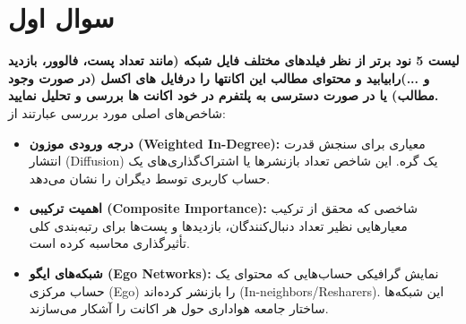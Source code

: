 \documentclass{article}
\begin{document}
\pagestyle{headings}
\maketitle
{}
\newpage
\begin{abstract}
	اعتراضات دی‌ماه ۱۴۰۴ در ایران، واکنشی به نوسانات ارزی و مشکلات معیشتی بود که به‌سرعت به مطالبات سیاسی گسترده‌تر تبدیل شد. این گزارش با استفاده از مفاهیم بنیادین علم شبکه، به تحلیل نقش سه پلتفرم تلگرام، اینستاگرام و توییتر می‌پردازد. داده‌های مستخرج از کدهای تحلیل شبکه، نشان‌دهنده ساختارهای قدرت متمرکز، استراتژی‌های جنگ شناختی و ظهور جریان‌های سلطنتی‌طلب به عنوان کنشگران اصلی انتشار محتوا در این بازه زمانی است.
	\\
	در دهه اخیر، شبکه‌های اجتماعی به میدان اصلی رقابت‌های سیاسی و اجتماعی در ایران تبدیل شده‌اند . اعتراضات دی‌ماه ۱۴۰۴، که با شعارهایی علیه نظام سیاسی همراه بود، نمونه بارزی از این تحول است. گزارش‌های میدانی از گسترش نارضایتی‌ها در شهرهای بزرگی مانند تهران، اصفهان و ایلام حکایت دارد . در چنین شرایطی، پلتفرم‌های دیجیتال به عنوان «ساختارهای سازمان‌دهی‌کننده» و «تقویت‌کننده روایت‌ها» عمل می‌کنند . هدف این گزارش، شناسایی بازیگران کلیدی (Key Players) در هر پلتفرم و تحلیل نقش آن‌ها در انتشار پیام‌های اعتراضی یا سرکوب روایت‌ها بر اساس شاخص‌های علم شبکه است.
	\\
	درادامه در قالب پاسخ به سوالات به تحلیل ابعاد مختلف اعتراضات دی 1404 می پردازیم:
\end{abstract}


\section{سوال اول}
\textbf{لیست 5 نود برتر از نظر فیلدهای مختلف فایل شبکه (مانند تعداد پست، فالوور، بازدید و ...)رابیابید و محتوای مطالب این
	اکانتها را درفایل های اکسل (در صورت وجود مطالب) یا در صورت دسترسی به پلتفرم در خود اکانت ها بررسی و تحلیل نمایید.}
\\
شاخص‌های اصلی مورد بررسی عبارتند از:
	\begin{itemize}
		\item \textbf{درجه ورودی موزون (Weighted In-Degree):} معیاری برای سنجش قدرت انتشار (Diffusion) یک گره. این شاخص تعداد بازنشرها یا اشتراک‌گذاری‌های یک حساب کاربری توسط دیگران را نشان می‌دهد.
		\item \textbf{اهمیت ترکیبی (Composite Importance):} شاخصی که محقق از ترکیب معیارهایی نظیر تعداد دنبال‌کنندگان، بازدیدها و پست‌ها برای رتبه‌بندی کلی تأثیرگذاری محاسبه کرده است.
		\item \textbf{شبکه‌های ایگو (Ego Networks):} نمایش گرافیکی حساب‌هایی که محتوای یک حساب مرکزی (Ego) را بازنشر کرده‌اند (In-neighbors/Resharers). این شبکه‌ها ساختار جامعه هواداری حول هر اکانت را آشکار می‌سازند.
	\end{itemize}
	
\end{document}
